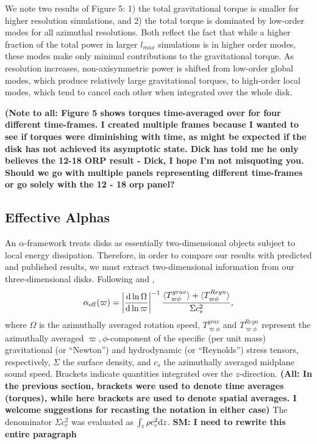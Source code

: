 \documentclass[manuscript]{aastex}
\begin{document}
We note two results of Figure 5: 1) the total gravitational torque is smaller for higher resolution simulations, and 2) the total torque is dominated by low-order modes for all azimuthal resolutions. Both reflect the fact that while a higher fraction of the total power in larger $l_{max}$ simulations is in higher order modes, these modes make only minimal contributions to the gravitational torque. As resolution increases, non-axisymmetric power is shifted from low-order global modes, which produce relatively large gravitational torques, to high-order local modes, which tend to cancel each other when integrated over the whole disk. 

{\bf (Note to all: Figure 5 shows torques
time-averaged over for four different time-frames.  I created multiple frames because I wanted to see if torques were 
diminishing with time, as might be expected if the disk has not achieved its asymptotic state.  
Dick has told me he only believes the 12-18 ORP result - Dick, I hope 
I'm not misquoting you. Should we go with multiple panels representing different time-frames or 
go solely with the 12 - 18 orp panel?
} 

\subsection{Effective Alphas}

An $\alpha$-framework treats disks as essentially two-dimensional objects subject to local energy dissipation.  Therefore, in order to compare our results with predicted and published results, we must extract two-dimensional information from our three-dimensional disks.  Following \cite{gammie2001} and \citet{lodato2004}, 
\begin{equation}
\label{alpha1}
\alpha_{\rm{eff}}(\varpi) = \left| \frac{{\rm d} \ln \Omega}{{\rm d} \ln \varpi} \right|^{-1} 
\frac {\langle T_{\varpi\phi}^{grav}\rangle + \langle T_{\varpi\phi}^{Reyn}\rangle}
{\Sigma c_s^2 },
\end{equation}
where $\Omega$ is the azimuthally averaged rotation speed, $T_{\varpi\phi}^{grav}$ and $T_{\varpi\phi}^{Reyn}$ represent the azimuthally averaged $\varpi,\phi$-component of the specific (per unit mass) gravitational 
(or ``Newton'') and hydrodynamic (or ``Reynolds'') stress tensors, respectively, $\Sigma$ the surface density,
and $c_s$ the azimuthally averaged midplane sound speed.  Brackets indicate quantities integrated over the $z$-direction. 
{\bf (All: In the previous section, brackets were used to denote time averages (torques),  while here brackets are used to denote spatial
averages.  I welcome suggestions for recasting the notation in either case)}
The denominator $\Sigma c_c^2$ was evaluated as $\int_z \rho c_c^2 {\rm d}z$. {\bf SM: I need to rewrite this entire paragraph}
 
\end{document}
